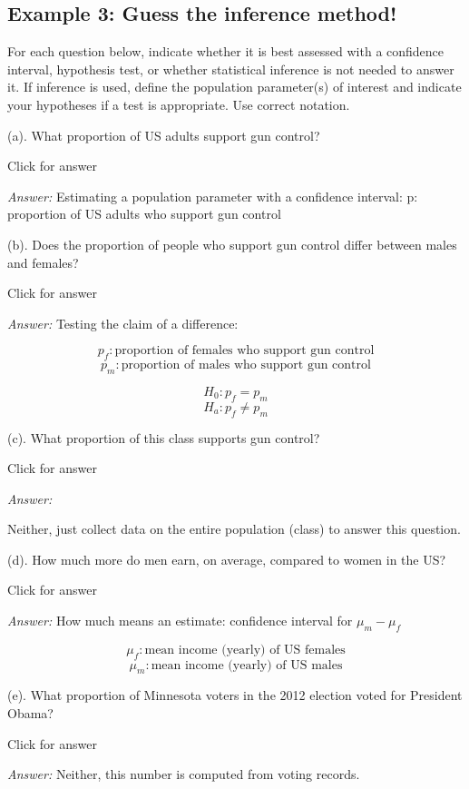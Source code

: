 \documentclass[
]{book}
\begin{document}
\hypertarget{example-3-guess-the-inference-method}{%
\subsection{Example 3: Guess the inference method!}\label{example-3-guess-the-inference-method}}

For each question below, indicate whether it is best assessed with a confidence interval, hypothesis test, or whether statistical inference is not needed to answer it. If inference is used, define the population parameter(s) of interest and indicate your hypotheses if a test is appropriate. Use correct notation.

(a). What proportion of US adults support gun control?

Click for answer

\emph{Answer:} Estimating a population parameter with a confidence interval: p: proportion of US adults who support gun control

(b). Does the proportion of people who support gun control differ between males and females?

Click for answer

\emph{Answer:} Testing the claim of a difference:

\[p_f: \text{proportion of females who support gun control}\]
\[p_m: \text{proportion of males who support gun control}\]

\[H_0: p_f = p_m\]
\[H_a: p_f \neq p_m\]

(c). What proportion of this class supports gun control?

Click for answer

\emph{Answer:}

Neither, just collect data on the entire population (class) to answer this question.

(d). How much more do men earn, on average, compared to women in the US?

Click for answer

\emph{Answer:} How much means an estimate: confidence interval for \(\mu_m - \mu_f\)

\[\mu_f: \text{mean income (yearly) of US females}\]
\[\mu_m: \text{mean income (yearly) of US males}\]

(e). What proportion of Minnesota voters in the 2012 election voted for President Obama?

Click for answer

\emph{Answer:} Neither, this number is computed from voting records.
\end{document}
